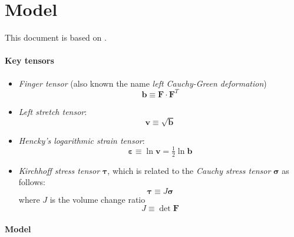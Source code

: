 \documentclass[garamond]{goose-article}
\newcommand\T[1]{\bm{{#1}}}
\begin{document}



\section{Model}

This document is based on \citet{Geers2004}.

\paragraph{Key tensors}

\begin{itemize}
  \item \emph{Finger tensor} (also known the name \emph{left Cauchy-Green deformation})
  \begin{equation}
    \T{b} \equiv \T{F} \cdot \T{F}^T
  \end{equation}
  \item \emph{Left stretch tensor}:
  \begin{equation}
    \T{v} \equiv \sqrt{\T{b}}
  \end{equation}
  \item \emph{Hencky’s logarithmic strain tensor}:
  \begin{equation}
    \T{\varepsilon} \equiv \ln \T{v} = \tfrac{1}{2} \ln \T{b}
  \end{equation}
  \item \emph{Kirchhoff stress tensor} $\T{\tau}$, which is related to the \emph{Cauchy stress tensor} $\T{\sigma}$ as follows:
  \begin{equation}
    \T{\tau} \equiv J \T{\sigma}
  \end{equation}
  where $J$ is the volume change ratio
  \begin{equation}
    J \equiv \det \T{F}
  \end{equation}
\end{itemize}

\paragraph{Model}
\end{document}
